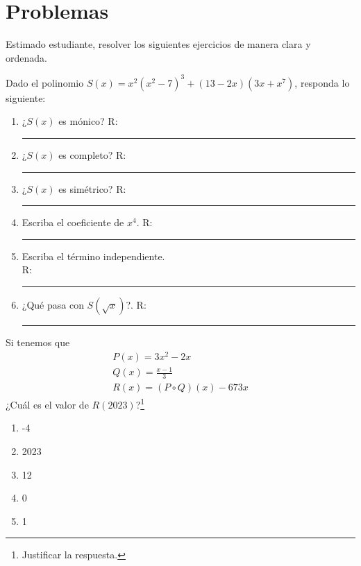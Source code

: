 \section*{\large Problemas}

Estimado estudiante, resolver los siguientes ejercicios de manera clara y ordenada.

\begin{exercise}
    Dado el polinomio $S(x) = x^2(x^2 - 7)^3 + (13 - 2x)(3x + x^7)$, responda lo siguiente:
    \begin{multicols}{2}
        \begin{enumerate}
            \item ¿$S(x)$ es mónico? R: \rule{1cm}{0.1mm}
            \item ¿$S(x)$ es completo? R: \rule{1cm}{0.1mm}
            \item ¿$S(x)$ es simétrico? R: \rule{1cm}{0.1mm}
            \item Escriba el coeficiente de $x^4$. R: \rule{1cm}{0.1mm}
            \item Escriba el término independiente.\\ R: \rule{1cm}{0.1mm}
            \item ¿Qué pasa con $S(\sqrt{x})$?. R: \rule{1cm}{0.1mm}
        \end{enumerate}
    \end{multicols}
\end{exercise}

\begin{exercise}
    Si tenemos que
    \begin{align*}
        P(x) = 3x^2 - 2x \\
        Q(x) = \frac{x - 1}{3} \\
        R(x) = (P \circ Q)(x) - 673x
    \end{align*}
    ¿Cuál es el valor de $R(2023)$?\footnote{Justificar la respuesta.}
    \begin{multicols}{5}
        \begin{enumerate}
            \item -4
            \item 2023
            \item 12
            \item 0
            \item 1
        \end{enumerate}
    \end{multicols}
\end{exercise}

